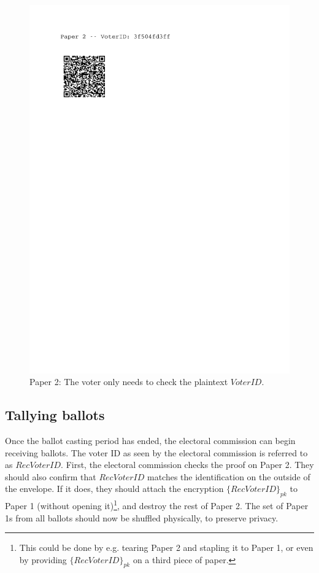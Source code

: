 \documentclass[12pt,a4paper]{article}
\theoremstyle{definition}
\newcommand{\VoterID}{\mathit{VoterID}}
\newcommand{\receivedvid}{\mathit{RecVoterID}}
\begin{document}
\begin{figure}
	\includegraphics[scale=0.5, trim=0cm 22cm 4cm 0cm, clip=true]{paper2.pdf}
	\caption{Paper 2: The voter only needs to check the plaintext $\VoterID$.}
		\label{fig:paper2}
\end{figure}


\subsection{Tallying ballots}
Once the ballot casting period has ended, the electoral commission can begin receiving ballots. The voter ID as seen by the electoral commission is referred to as $\receivedvid$. First, the electoral commission checks the proof on Paper 2. 
They should also confirm that $\receivedvid$ matches the identification on the outside of the envelope. If it does, they should attach the encryption $\{\receivedvid\}_{pk}$ to Paper 1 (without opening it)\footnote{This could be done by e.g. tearing Paper 2 and stapling it to Paper 1, or even by providing $\{\receivedvid\}_{pk}$ on a third piece of paper.}, and destroy the rest of Paper 2. The set of Paper 1s from all ballots should now be shuffled physically, to preserve privacy.
\end{document}
